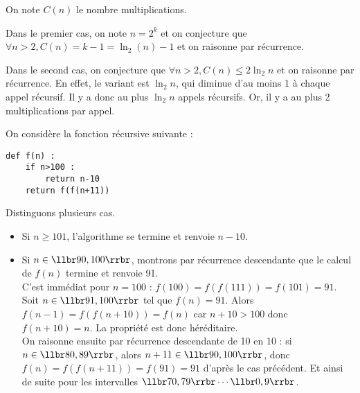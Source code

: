 \ifprof
\begin{corrige}
On note $C(n)$ le nombre multiplications.

Dans le premier cas, on note $n=2^k$ et on conjecture que $\forall n>2, C(n)=k-1=\ln_2 (n)-1$ et on raisonne par 
récurrence.

Dans le second cas, on conjecture que $\forall n>2, C(n)\leq 2\ln_2 n$ et on raisonne par récurrence. En effet, le 
variant est $\ln_2 n$, qui diminue d'au moins 1 à chaque appel récursif. Il y a donc au plus $\ln_2 n$ appels 
récursifs. Or, il y a au plus 2 multiplications par appel.
\end{corrige}
\else
\fi




\setcounter{question}{0}


On considère la fonction récursive suivante : 
\begin{lstlisting}
def f(n) :
    if n>100 : 
        return n-10
    return f(f(n+11))
\end{lstlisting}

\ifprof
\begin{corrige}

Distinguons plusieurs cas.

\begin{itemize}
\item Si $n\geq 101$, l'algorithme se termine et renvoie $n-10$. 
\item Si $n\in\llbr90, 100\rrbr$, montrons par récurrence descendante que le calcul de $f(n)$ termine et renvoie 
91.\\
C'est immédiat pour $n=100$ : $f(100)=f(f(111))=f(101)=91$.\\
Soit $n\in\llbr91,100\rrbr$ tel que $f(n)=91$. Alors $f(n-1)=f(f(n+10))=f(n)$ car $n+10>100$ donc $f(n+10)=n$. La 
propriété est 
donc héréditaire.\\
On raisonne ensuite par récurrence descendante de 10 en 10 : si $n\in\llbr80,89\rrbr$, alors $n+11\in\llbr90,100\rrbr$, 
donc $f(n)=f(f(n+11))=f(91)=91$ d'après le cas précédent. Et ainsi de suite pour les intervalles 
$\llbr70,79\rrbr\cdots\llbr0,9\rrbr$.
\end{itemize}
\end{corrige}


\else
\fi






